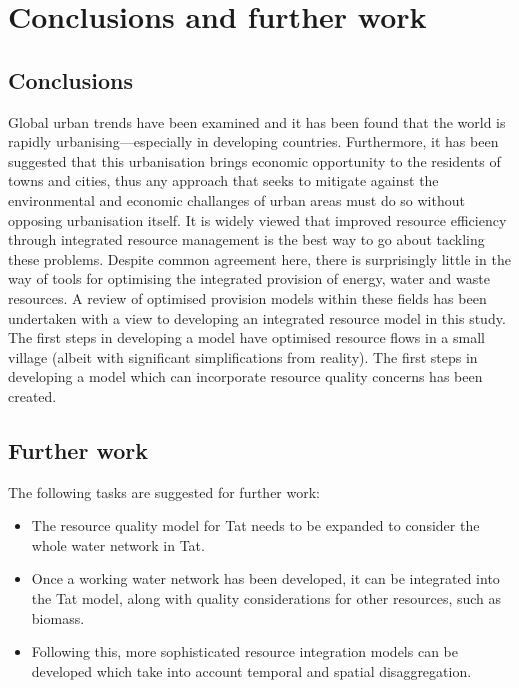 \section{Conclusions and further work}
\label{sec:conc}

\subsection{Conclusions}
Global urban trends have been examined and it has been found that the world is rapidly urbanising---especially in developing countries. Furthermore, it has been suggested that this urbanisation brings economic opportunity to the residents of towns and cities, thus any approach that seeks to mitigate against the environmental and economic challanges of urban areas must do so without opposing urbanisation itself. It is widely viewed that improved resource efficiency through integrated resource management is the best way to go about tackling these problems. Despite common agreement here, there is surprisingly little in the way of tools for optimising the integrated provision of energy, water and waste resources. A review of optimised provision models within these fields has been undertaken with a view to developing an integrated resource model in this study. The first steps in developing a model have optimised resource flows in a small village (albeit with significant simplifications from reality). The first steps in developing a model which can incorporate resource quality concerns has been created.

\subsection{Further work}
The following tasks are suggested for further work:
\begin{itemize}
	\item The resource quality model for Tat needs to be expanded to consider the whole water network in Tat.
	\item Once a working water network has been developed, it can be integrated into the Tat model, along with quality considerations for other resources, such as biomass. 
	\item Following this, more sophisticated resource integration models can be developed which take into account temporal and spatial disaggregation.
\end{itemize}
